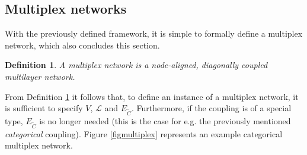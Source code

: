 \documentclass[12pt,a4paper,twoside,openright]{report}
\newtheorem{mydef}{Definition}
\begin{document}
\subsection{Multiplex networks}\label{secmuxnet}

With the previously defined framework, it is simple to formally define a multiplex network, which also concludes this section.
\begin{mydef}\label{def:mux}
\rm A \emph{multiplex network} is a node-aligned, diagonally coupled multilayer network.
\end{mydef}

\noindent From Definition \ref{def:mux} it follows that, to define an instance of a multiplex network, it is sufficient to specify $V$, $\mathcal{L}$ and $E_{\widetilde{C}}$. Furthermore, if the coupling is of a special type, $E_{\widetilde{C}}$ is no longer needed (this is the case for e.g. the previously mentioned \emph{categorical} coupling). Figure \ref{figmultiplex} represents an example categorical multiplex network.
\end{document}
